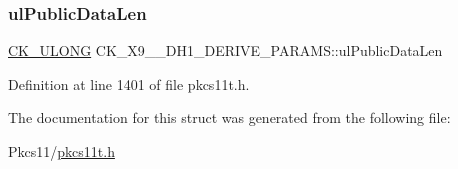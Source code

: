 \subsubsection{\texorpdfstring{ul\+Public\+Data\+Len}{ulPublicDataLen}}
{\footnotesize\ttfamily \hyperlink{pkcs11t_8h_a35181858a3b7a0a81f49d180d8f446ef}{C\+K\+\_\+\+U\+L\+O\+NG} C\+K\+\_\+\+X9\+\_\+\_\+\+D\+H1\+\_\+\+D\+E\+R\+I\+V\+E\+\_\+\+P\+A\+R\+A\+M\+S\+::ul\+Public\+Data\+Len}



Definition at line 1401 of file pkcs11t.\+h.



The documentation for this struct was generated from the following file\+:\begin{DoxyCompactItemize}
\item 
Pkcs11/\hyperlink{pkcs11t_8h}{pkcs11t.\+h}\end{DoxyCompactItemize}

